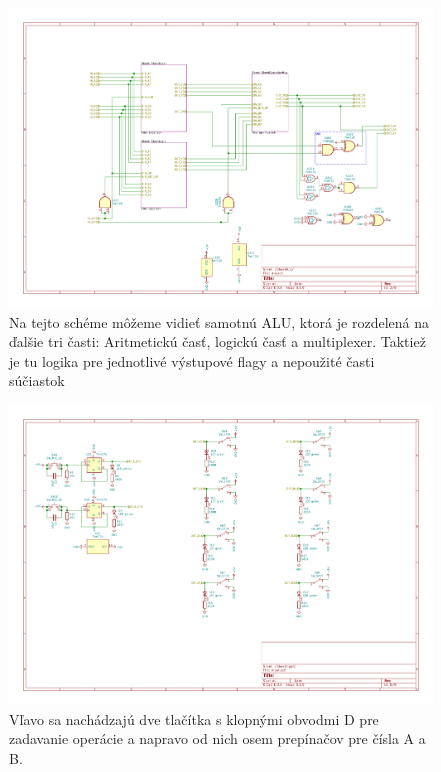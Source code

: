 \documentclass{article}
\begin{document}
    \begin{figure}[h!]
        \centering
        \includegraphics[width=.8\linewidth]{alu_sheet.pdf}
        \caption{Na tejto schéme môžeme vidieť samotnú ALU, ktorá je rozdelená na ďalšie tri časti: Aritmetickú časť, logickú časť a multiplexer. Taktiež je tu logika pre jednotlivé výstupové flagy a nepoužité časti súčiastok}
    \end{figure}

    \begin{figure}[h!]
        \centering
        \includegraphics[width=.8\linewidth]{input_sheet.pdf}
        \caption{Vľavo sa nachádzajú dve tlačítka s klopnými obvodmi D pre zadavanie operácie a napravo od nich osem prepínačov pre čísla A a B.}
    \end{figure}
\end{document}

